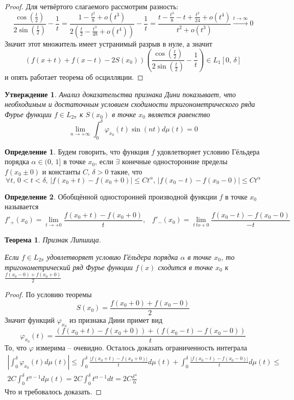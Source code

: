 \documentclass[a4paper,12pt]{article}
\renewcommand{\phi}{\ensuremath{\varphi}}
\renewcommand{\leq}{\ensuremath{\leqslant}}
\theoremstyle{plain}
\newtheorem{theorem}{Теорема}[section]
\newtheorem{proposition}{Утверждение}[section]
\theoremstyle{definition}
\newtheorem{definition}{Определение}[section]
\theoremstyle{remark}
\begin{document}
\begin{proof}
	Для четвёртого слагаемого рассмотрим разность:
	\[\frac{\cos(\frac{t}{2})}{2\sin(\frac{t}{2})} - \frac{1}{t} = \frac{1 - \frac{t^2}{8} + o(t^3)}{2\left(\frac{t}{2} - \frac{t^3}{48} + o(t^4)\right)} - \frac{1}{t} = \frac{t - \frac{t^3}{8} - t + \frac{t^3}{24} + o(t^4)}{t^2 + o(t^3)} \stackrel{t \to \infty}{\to} 0\]
	Значит этот множитель имеет устранимый разрыв в нуле, а значит
	\[(f(x + t) + f(x - t) - 2S(x_0))\left(\frac{\cos(\frac{t}{2})}{2\sin(\frac{t}{2})} - \frac{1}{t}\right) \in L_1[0,\,\delta]\]
	и опять работает теорема об осцилляции.
\end{proof}

\begin{proposition}
	\label{DINI_NOTE}
	Анализ доказательства признака Дини показывает, что необходимым и достаточным условием сходимости тригонометрического ряда Фурье функции $f \in L_{2\pi}$ к $S(x_0)$ в точке $x_0$ является равенство
	\[\lim_{n \to +\infty} \int_0^\delta \phi_{x_0}(t)\sin(nt)d\mu(t) = 0\]
\end{proposition}

\begin{definition} \label{GELDER}
	Будем говорить, что функция $f$ удовлетворяет условию Гёльдера порядка $\alpha \in (0,\,1]$ в точке $x_0$, если $\exists$ конечные односторонние пределы $f(x_0 \pm 0)$ и константы $C,\, \delta > 0$ такие, что
	\[
		\forall t,\, 0 < t < \delta,\, |f(x_0 + t) - f(x_0 + 0)| \leq Ct^\alpha,\, |f(x_0 - t) - f(x_0 - 0)| \leq Ct^\alpha
	\]
\end{definition}

\begin{definition}
	Обобщённой односторонней производной функции $f$ в точке $x_0$ называется
	\[f'_+(x_0) = \lim_{t \to +0} \frac{f(x_0 + t) - f(x_0 + 0)}{t},\;\;\; f'_-(x_0) = \lim_{t \ to +0} \frac{f(x_0 - t) - f(x_0 - 0)}{-t}\]
\end{definition}

\begin{theorem}
	Признак Липшица.

	Если $f \in L_{2\pi}$ удовлетворяет условию Гёльдера порядка $\alpha$ в точке $x_0$, то тригонометрический ряд Фурье функции $f(x)$ сходится в точке $x_0$ к $\frac{f(x_0 - 0) + f(x_0 + 0)}{2}$
\end{theorem}

\begin{proof}
	По условию теоремы
	\[S(x_0) = \frac{f(x_0 + 0) + f(x_0 - 0)}{2}\]
	Значит функций $\phi_{x_0}$ из признака Дини примет вид
	\[\phi_{x_0}(t) = \frac{(f(x_0 + t) - f(x_0 + 0)) + (f(x_0 - t) - f(x_0 - 0))}{t}\]
	То, что $\phi$ измерима -- очевидно. Осталось доказать ограниченность интеграла
	\begin{align*}
		\left|\int_0^\delta \phi_{x_0}(t)d\mu(t)\right| \leq \int_0^\delta \frac{|f(x_0 + t) - f(x_0 + 0)|}{t}d\mu(t) + \int_0^\delta \frac{|f(x_0 - t) - f(x_0 - 0)|}{t}d\mu(t) \leq \\
		2C\int_0^\delta t^{\alpha - 1}d\mu(t) = 2C \int_0^\delta t^{\alpha - 1}dt = 2C\frac{\delta^\alpha}{\alpha}
	\end{align*}
	Что и требовалось доказать.
\end{proof}
\end{document}
